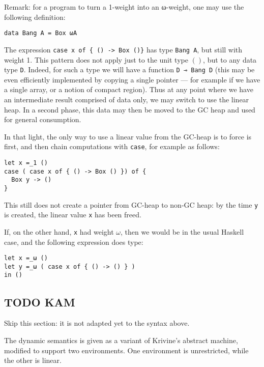 \documentclass[11pt]{article}
\begin{document}
Remark: for a program to turn a 1-weight into an ω-weight, one may use
the following definition:
\begin{verbatim}
data Bang A = Box ωA
\end{verbatim}
The expression \verb|case x of { () -> Box ()}| has type
\verb|Bang A|, but still with weight 1.  This pattern does not apply
just to the unit type $()$, but to any data type \verb|D|. Indeed, for such
a type we will have a function \verb|D ⊸ Bang D| (this may be even
efficiently implemented by copying a single pointer --- for example if
we have a single array, or a notion of compact region).  Thus at any
point where we have an intermediate result comprised of data only, we
may switch to use the linear heap. In a second phase, this data may
then be moved to the GC heap and used for general consumption.

In that light, the only way to use a linear value from the GC-heap is
to force is first, and then chain computations with \verb|case|, for
example as follows:
\begin{verbatim}
let x =_1 ()
case ( case x of { () -> Box () }) of {
  Box y -> ()
}
\end{verbatim}
This still does not create a pointer from GC-heap to non-GC heap: by the
time \verb|y| is created, the linear value \verb|x| has been freed.

If, on the other hand, \verb|x| had weight $ω$, then we would be in the
usual Haskell case, and the following expression does type:
\begin{verbatim}
let x =_ω ()
let y =_ω ( case x of { () -> () } )
in ()
\end{verbatim}


\subsection{{\bfseries\sffamily TODO} KAM}
\label{sec:orgheadline14}

Skip this section: it is not adapted yet to the syntax above.

The dynamic semantics is given as a variant of Krivine's abstract
machine, modified to support two environments. One environment is
unrestricted, while the other is linear.
\end{document}
